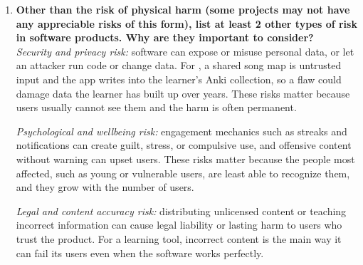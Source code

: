 \documentclass{article}
\begin{document}
\begin{enumerate}
    \item \textbf{Other than the risk of physical harm (some projects may not
    have any appreciable risks of this form), list at least 2 other types of
    risk in software products. Why are they important to consider?}\\
    \emph{Security and privacy risk:} software can expose or misuse personal
    data, or let an attacker run code or change data. For \progname{}, a
    shared song map is untrusted input and the app writes into the learner's
    Anki collection, so a flaw could damage data the learner has built up
    over years. These risks matter because users usually cannot see them and
    the harm is often permanent.

    \emph{Psychological and wellbeing risk:} engagement mechanics such as
    streaks and notifications can create guilt, stress, or compulsive use,
    and offensive content without warning can upset users. These risks
    matter because the people most affected, such as young or vulnerable
    users, are least able to recognize them, and they grow with the number
    of users.

    \emph{Legal and content accuracy risk:} distributing unlicensed content or
    teaching incorrect information can cause legal liability or lasting
    harm to users who trust the product. For a learning tool, incorrect
    content is the main way it can fail its users even when the software
    works perfectly.
\end{enumerate}
\end{document}
